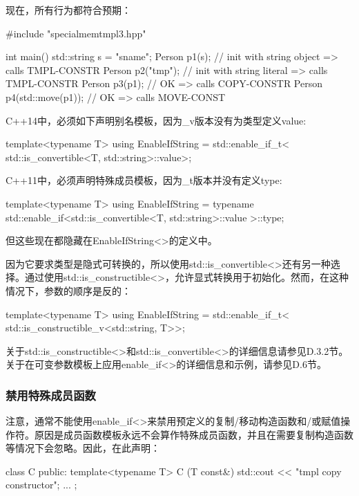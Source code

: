 现在，所有行为都符合预期：

\begin{cpp}
#include "specialmemtmpl3.hpp"

int main()
{
	std::string s = "sname";
	Person p1(s); // init with string object => calls TMPL-CONSTR
	Person p2("tmp"); // init with string literal => calls TMPL-CONSTR
	Person p3(p1); // OK => calls COPY-CONSTR
	Person p4(std::move(p1)); // OK => calls MOVE-CONST
}
\end{cpp}

C++14中，必须如下声明别名模板，因为\_v版本没有为类型定义value:

\begin{cpp}
template<typename T>
using EnableIfString = std::enable_if_t<
						std::is_convertible<T, std::string>::value>;
\end{cpp}

C++11中，必须声明特殊成员模板，因为\_t版本并没有定义type:

\begin{cpp}
template<typename T>
using EnableIfString
= typename std::enable_if<std::is_convertible<T, std::string>::value
						>::type;
\end{cpp}

但这些现在都隐藏在EnableIfString<>的定义中。

因为它要求类型是隐式可转换的，所以使用std::is\_convertible<>还有另一种选择。通过使用std::is\_constructible<>，允许显式转换用于初始化。然而，在这种情况下，参数的顺序是反的：

\begin{cpp}
template<typename T>
using EnableIfString = std::enable_if_t<
						std::is_constructible_v<std::string, T>>;
\end{cpp}

关于std::is\_constructible<>和std::is\_convertible<>的详细信息请参见D.3.2节。关于在可变参数模板上应用enable\_if<>的详细信息和示例，请参见D.6节。

\subsubsection{禁用特殊成员函数}

注意，通常不能使用enable\_if<>来禁用预定义的复制/移动构造函数和/或赋值操作符。原因是成员函数模板永远不会算作特殊成员函数，并且在需要复制构造函数等情况下会忽略。因此，在此声明：

\begin{cpp}
class C {
public:
	template<typename T>
	C (T const&) {
		std::cout << "tmpl copy constructor\n";
	}
	...
};
\end{cpp}

